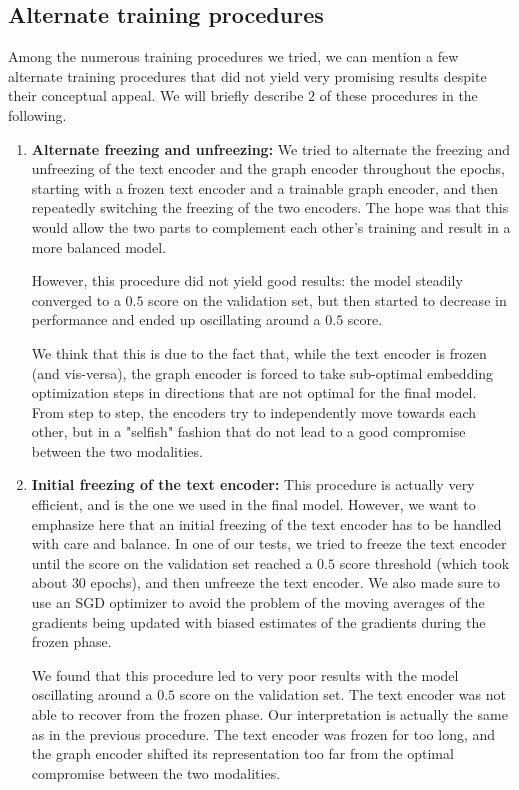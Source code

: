 \documentclass[switch, 12pt]{article}
\begin{document}
\begin{multicols}{2}
    \subsection{Alternate training procedures}
    Among the numerous training procedures we tried, we can mention a few alternate training procedures that did not yield very promising results despite their conceptual appeal. We will briefly describe $2$ of these procedures in the following.
    \begin{enumerate}
        \item \textbf{Alternate freezing and unfreezing: } We tried to alternate the freezing and unfreezing of the text encoder and the graph encoder throughout the epochs, starting with a frozen text encoder and a trainable graph encoder, and then repeatedly switching the freezing of the two encoders. The hope was that this would allow the two parts to complement each other's training and result in a more balanced model.

              However, this procedure did not yield good results: the model steadily converged to a $0.5$ score on the validation set, but then started to decrease in performance and ended up oscillating around a $0.5$ score.

              We think that this is due to the fact that, while the text encoder is frozen (and vis-versa), the graph encoder is forced to take sub-optimal embedding optimization steps in directions that are not optimal for the final model. From step to step, the encoders try to independently move towards each other, but in a "selfish" fashion that do not lead to a good compromise between the two modalities.
        \item \textbf{Initial freezing of the text encoder: } This procedure is actually very efficient, and is the one we used in the final model. However, we want to emphasize here that an initial freezing of the text encoder has to be handled with care and balance. In one of our tests, we tried to freeze the text encoder until the score on the validation set reached a $0.5$ score threshold (which took about $30$ epochs), and then unfreeze the text encoder. We also made sure to use an SGD optimizer to avoid the problem of the moving averages of the gradients being updated with biased estimates of the gradients during the frozen phase.

              We found that this procedure led to very poor results with the model oscillating around a $0.5$ score on the validation set. The text encoder was not able to recover from the frozen phase. Our interpretation is actually the same as in the previous procedure. The text encoder was frozen for too long, and the graph encoder shifted its representation too far from the optimal compromise between the two modalities.

    \end{enumerate}

    \newpage

    

\end{multicols}
\end{document}
